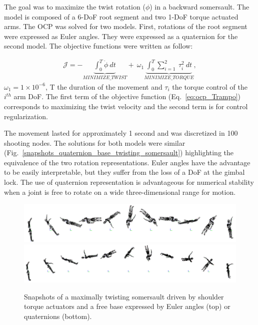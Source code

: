 The goal was to maximize the twist rotation ($\phi$) in a backward somersault.
The model is composed of a 6-DoF root segment and two 1-DoF torque actuated arms.
The OCP was solved for two models.
First, rotations of the root segment were expressed as Euler angles.
They were expressed as a quaternion for the second model.
The objective functions were written as follow:

\begin{eqnarray}\label{eq:ocp_Trampo}
\mathcal{J} = -\underbrace{\int_0^T \dot{\phi}~dt}_{MINIMIZE\_TWIST}  +~\omega_1 \underbrace{\int_0^T \sum_{i=1}^{2}~\tau_{i}^2~dt}_{MINIMIZE\_ TORQUE},
\end{eqnarray}
 $\omega_1 = 1\times 10^{-6}$, T the duration of the movement and $\tau_{i}$ the torque control of the $i^{th}$ arm DoF.
The first term of the objective function (Eq.~\ref{eq:ocp_Trampo}) corresponds to maximizing the twist velocity and the second term is for control regularization.


The movement lasted for approximately 1 second and was discretized in 100 shooting nodes.
The solutions for both models were similar (Fig.~\ref{snapshots_quaternion_base_twisting_somersault}) highlighting the equivalence of the two rotation representations.
Euler angles have the advantage to be easily interpretable, but they suffer from the loss of a DoF at the gimbal lock.
The use of quaternion representation is advantageous for numerical stability when a joint is free to rotate on a wide three-dimensional range for motion.


\begin{figure}[t!]
\centering
\includegraphics[width=\textwidth]{figures/Euler_Bioptim_MaxVrille_2.png}\\
\vspace*{0.5em}
\includegraphics[width=\textwidth]{figures/Quat_Bioptim_MaxVrille_2.png}
\caption{Snapshots of a maximally twisting somersault driven by shoulder torque actuators and a free base expressed by Euler angles (top) or quaternions (bottom).}
\label{fig:snapshots_quaternion_base_twisting_somersault}
\end{figure}


